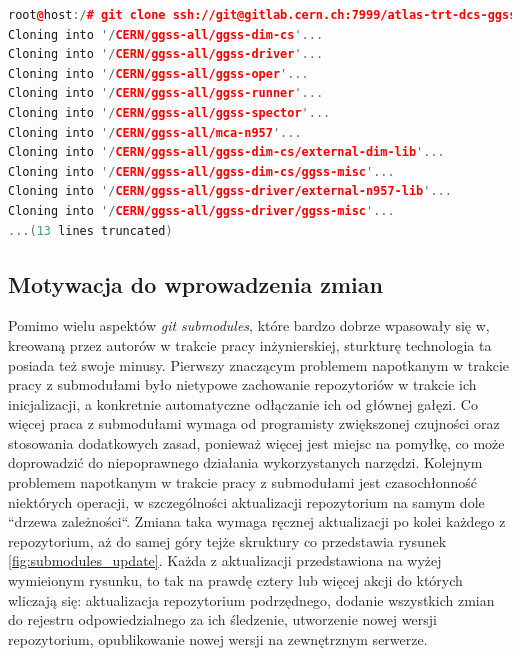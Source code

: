 \begin{lstlisting}[language=c++, caption={Inicjalizacja pełnej sturktury projektu jedną komendą.}, label={lst:initialize}]
root@host:/# git clone ssh://git@gitlab.cern.ch:7999/atlas-trt-dcs-ggss/ggss-all.git && cd ggss-all && git submodule update --init --recursive
Cloning into '/CERN/ggss-all/ggss-dim-cs'...
Cloning into '/CERN/ggss-all/ggss-driver'...
Cloning into '/CERN/ggss-all/ggss-oper'...
Cloning into '/CERN/ggss-all/ggss-runner'...
Cloning into '/CERN/ggss-all/ggss-spector'...
Cloning into '/CERN/ggss-all/mca-n957'...
Cloning into '/CERN/ggss-all/ggss-dim-cs/external-dim-lib'...
Cloning into '/CERN/ggss-all/ggss-dim-cs/ggss-misc'...
Cloning into '/CERN/ggss-all/ggss-driver/external-n957-lib'...
Cloning into '/CERN/ggss-all/ggss-driver/ggss-misc'...
...(13 lines truncated)
\end{lstlisting}


\subsection{Motywacja do wprowadzenia zmian}

Pomimo wielu aspektów \emph{git submodules}, które bardzo dobrze wpasowały się w, kreowaną przez autorów w trakcie pracy inżynierskiej, sturkturę technologia ta posiada też swoje minusy. Pierwszy znaczącym problemem napotkanym w trakcie pracy z submodułami było nietypowe zachowanie repozytoriów w trakcie ich inicjalizacji, a konkretnie automatyczne odłączanie ich od głównej gałęzi. Co więcej praca z submodułami wymaga od programisty zwiększonej czujności oraz stosowania dodatkowych zasad, ponieważ więcej jest miejsc na pomyłkę, co może doprowadzić do niepoprawnego działania wykorzystanych narzędzi. Kolejnym problemem napotkanym w trakcie pracy z submodułami jest czasochłonność niektórych operacji, w szczególności aktualizacji repozytorium na samym dole ``drzewa zależności``. Zmiana taka wymaga ręcznej aktualizacji po kolei każdego z repozytorium, aż do samej góry tejże skruktury co przedstawia rysunek \ref {fig:submodules_update}. Każda z aktualizacji przedstawiona na wyżej wymieionym rysunku, to tak na prawdę cztery lub więcej akcji do których wliczają się: aktualizacja repozytorium podrzędnego, dodanie wszystkich zmian do rejestru odpowiedzialnego za ich śledzenie, utworzenie nowej wersji repozytorium, opublikowanie nowej wersji na zewnętrznym serwerze.



